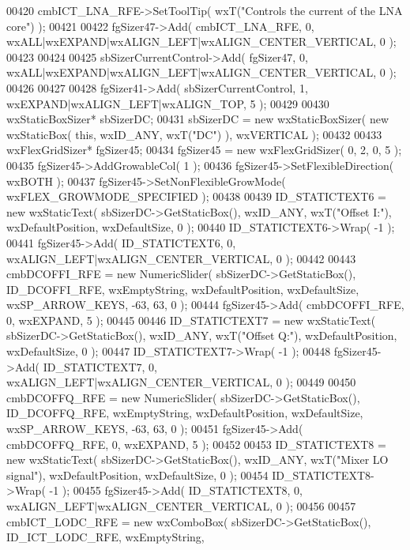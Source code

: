 \begin{DoxyCode}
00420     cmbICT_LNA_RFE->SetToolTip( wxT(\textcolor{stringliteral}{"Controls the current of the LNA core"}) );
00421     
00422     fgSizer47->Add( cmbICT_LNA_RFE, 0, wxALL|wxEXPAND|wxALIGN\_LEFT|wxALIGN\_CENTER\_VERTICAL, 0 );
00423     
00424     
00425     sbSizerCurrentControl->Add( fgSizer47, 0, wxALL|wxEXPAND|wxALIGN\_LEFT|wxALIGN\_CENTER\_VERTICAL, 0 );
00426     
00427     
00428     fgSizer41->Add( sbSizerCurrentControl, 1, wxEXPAND|wxALIGN\_LEFT|wxALIGN\_TOP, 5 );
00429     
00430     wxStaticBoxSizer* sbSizerDC;
00431     sbSizerDC = \textcolor{keyword}{new} wxStaticBoxSizer( \textcolor{keyword}{new} wxStaticBox( \textcolor{keyword}{this}, wxID\_ANY, wxT(\textcolor{stringliteral}{"DC"}) ), wxVERTICAL );
00432     
00433     wxFlexGridSizer* fgSizer45;
00434     fgSizer45 = \textcolor{keyword}{new} wxFlexGridSizer( 0, 2, 0, 5 );
00435     fgSizer45->AddGrowableCol( 1 );
00436     fgSizer45->SetFlexibleDirection( wxBOTH );
00437     fgSizer45->SetNonFlexibleGrowMode( wxFLEX\_GROWMODE\_SPECIFIED );
00438     
00439     ID_STATICTEXT6 = \textcolor{keyword}{new} wxStaticText( sbSizerDC->GetStaticBox(), wxID\_ANY, wxT(\textcolor{stringliteral}{"Offset I:"}), 
      wxDefaultPosition, wxDefaultSize, 0 );
00440     ID_STATICTEXT6->Wrap( -1 );
00441     fgSizer45->Add( ID_STATICTEXT6, 0, wxALIGN\_LEFT|wxALIGN\_CENTER\_VERTICAL, 0 );
00442     
00443     cmbDCOFFI_RFE = \textcolor{keyword}{new} NumericSlider( sbSizerDC->GetStaticBox(), ID_DCOFFI_RFE, wxEmptyString, 
      wxDefaultPosition, wxDefaultSize, wxSP\_ARROW\_KEYS, -63, 63, 0 );
00444     fgSizer45->Add( cmbDCOFFI_RFE, 0, wxEXPAND, 5 );
00445     
00446     ID_STATICTEXT7 = \textcolor{keyword}{new} wxStaticText( sbSizerDC->GetStaticBox(), wxID\_ANY, wxT(\textcolor{stringliteral}{"Offset Q:"}), 
      wxDefaultPosition, wxDefaultSize, 0 );
00447     ID_STATICTEXT7->Wrap( -1 );
00448     fgSizer45->Add( ID_STATICTEXT7, 0, wxALIGN\_LEFT|wxALIGN\_CENTER\_VERTICAL, 0 );
00449     
00450     cmbDCOFFQ_RFE = \textcolor{keyword}{new} NumericSlider( sbSizerDC->GetStaticBox(), ID_DCOFFQ_RFE, wxEmptyString, 
      wxDefaultPosition, wxDefaultSize, wxSP\_ARROW\_KEYS, -63, 63, 0 );
00451     fgSizer45->Add( cmbDCOFFQ_RFE, 0, wxEXPAND, 5 );
00452     
00453     ID_STATICTEXT8 = \textcolor{keyword}{new} wxStaticText( sbSizerDC->GetStaticBox(), wxID\_ANY, wxT(\textcolor{stringliteral}{"Mixer LO signal"}), 
      wxDefaultPosition, wxDefaultSize, 0 );
00454     ID_STATICTEXT8->Wrap( -1 );
00455     fgSizer45->Add( ID_STATICTEXT8, 0, wxALIGN\_LEFT|wxALIGN\_CENTER\_VERTICAL, 0 );
00456     
00457     cmbICT_LODC_RFE = \textcolor{keyword}{new} wxComboBox( sbSizerDC->GetStaticBox(), ID_ICT_LODC_RFE, wxEmptyString, 

\end{DoxyCode}
